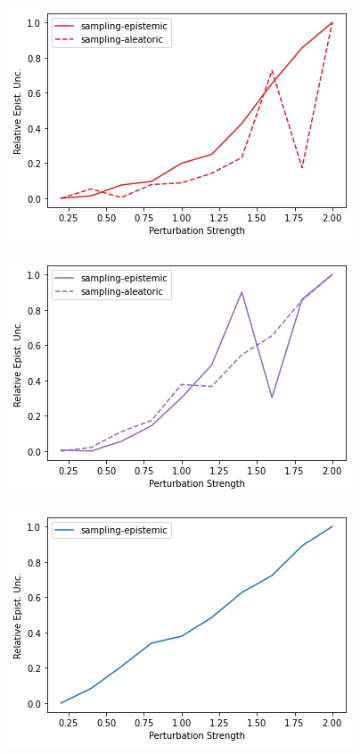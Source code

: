 \begin{figure}
    \begin{subfigure}{.24\textwidth}
        \includegraphics[width=\textwidth]{sections/011_icml2022/resources/state_shift-DropOut-LunarLanderShift-v0-mean_epistemic_uncertainty_.png}
    \end{subfigure}
    \begin{subfigure}{.24\textwidth}
        \includegraphics[width=\textwidth]{sections/011_icml2022/resources/state_shift-Ensemble-LunarLanderShift-v0-mean_epistemic_uncertainty_.png}
    \end{subfigure}
    \begin{subfigure}{.24\textwidth}
        \includegraphics[width=\textwidth]{sections/011_icml2022/resources/state_shift-DKL-LunarLanderShift-v0-mean_epistemic_uncertainty_.png}

\end{subfigure}
\end{figure}
